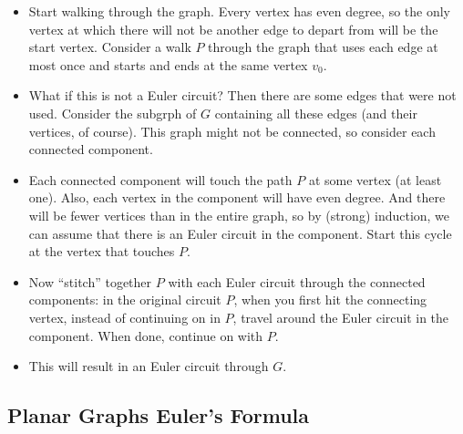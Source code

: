 \documentclass[12pt]{article}
\theoremstyle{plain}
\theoremstyle{definition}
\theoremstyle{remark}
\newcommand{\ex}{\noindent\textbf{Ex:} }
\newcommand{\todayis}[1]{\clearpage{\rhead{\footnotesize #1}}}
\begin{document}
\begin{itemize}
  \item Start walking through the graph.  Every vertex has even degree, so the only vertex at which there will not be another edge to depart from will be the start vertex.  Consider a walk $P$ through the graph that uses each edge at most once and starts and ends at the same vertex $v_0$.

  \item What if this is not a Euler circuit?  Then there are some edges that were not used.  Consider the subgrph of $G$ containing all these edges (and their vertices, of course).  This graph might not be connected, so consider each connected component.

  \item Each connected component will touch the path $P$ at some vertex (at least one).  Also, each vertex in the component will have even degree.  And there will be fewer vertices than in the entire graph, so by (strong) induction, we can assume that there is an Euler circuit in the component.  Start this cycle at the vertex that touches $P$.

  \item Now ``stitch'' together $P$ with each Euler circuit through the connected components: in the original circuit $P$, when you first hit the connecting vertex, instead of continuing on in $P$, travel around the Euler circuit in the component.  When done, continue on with $P$.

  \item This will result in an Euler circuit through $G$.





\end{itemize}




\todayis{Friday, September 14}
\subsection*{Planar Graphs Euler's Formula}
\end{document}
